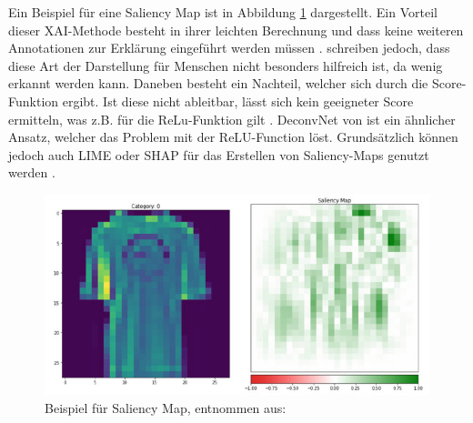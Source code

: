 Ein Beispiel für eine Saliency Map ist in Abbildung \ref{Fig:Saliency_Map_Beispiel} dargestellt.
Ein Vorteil dieser XAI-Methode besteht in ihrer leichten Berechnung und dass keine weiteren Annotationen zur Erklärung eingeführt werden müssen \cite{kamath2021explainable}. \textcite{Gianfagna.2021} schreiben jedoch, dass diese Art der Darstellung für Menschen nicht besonders hilfreich ist, da wenig erkannt werden kann. Daneben besteht ein Nachteil, welcher sich durch die Score-Funktion ergibt. Ist diese nicht ableitbar, lässt sich kein geeigneter Score ermitteln, was z.B. für die ReLu-Funktion gilt \cite{shrikumar2017learning}. DeconvNet von \cite{zeiler2014visualizing} ist ein ähnlicher Ansatz, welcher das Problem mit der ReLU-Function löst. Grundsätzlich können jedoch auch LIME oder SHAP für das Erstellen von Saliency-Maps genutzt werden \cite{molnar2022}.
\begin{figure}[h]
    \centering
    \includegraphics[scale=0.45]{pic/MA-Bilder/Literaturrecherche/Saliency-Map-Beispiel.PNG}
    \caption{Beispiel für Saliency Map, entnommen aus: \cite{kamath2021explainable}}
    \label{Fig:Saliency_Map_Beispiel}
\end{figure}

